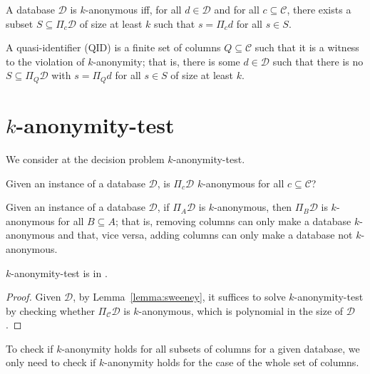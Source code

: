 \documentclass[12pt]{llncs}
\newcommand{\cC}{\mathcal{C}}
\newcommand{\cD}{\mathcal{D}}
\newcommand{\Proj}[1]{\Pi_{#1}}
\begin{document}
\begin{definition}[$k$-anonymity]
A database $\cD$ is $k$-anonymous iff, for all $d \in \cD$ and for all $c \subseteq \cC$, there exists a subset $S \subseteq \Proj{c} \cD$ of size at least $k$ such that $s = \Proj{c} d$ for all $s \in S$.
\end{definition}

\begin{definition}
A quasi-identifier (QID) is a finite set of columns $Q \subseteq \cC$ such that it is a witness to the violation of $k$-anonymity; that is, there is some $d \in \cD$ such that there is no $S \subseteq \Proj{Q} \cD$ with $s = \Proj{Q} d$ for all $s \in S$ of size at least $k$.
\end{definition}

\section{$k$-anonymity-test}

We consider at the decision problem $k$-anonymity-test.

\begin{problem}
Given an instance of a database $\cD$, is $\Proj{c} \cD$ $k$-anonymous for all $c \subseteq \cC$?
\end{problem}

\begin{lemma}
Given an instance of a database $\cD$, if $\Proj{A} \cD$ is $k$-anonymous, then $\Proj{B} \cD$ is $k$-anonymous for all $B \subseteq A$; that is, removing columns can only make a database $k$-anonymous and that, vice versa, adding columns can only make a database not $k$-anonymous.
\label{lemma:sweeney}
\end{lemma}

\begin{proposition}
$k$-anonymity-test is in .
\end{proposition}

\begin{proof}
Given $\cD$, by Lemma~\ref{lemma:sweeney}, it suffices to solve $k$-anonymity-test by checking whether $\Proj{\cC} \cD$ is $k$-anonymous, which is polynomial in the size of $\cD$.
\end{proof}

\begin{corollary}
To check if $k$-anonymity holds for all subsets of columns for a given database, we only need to check if $k$-anonymity holds for the case of the whole set of columns.
\end{corollary}
\end{document}
